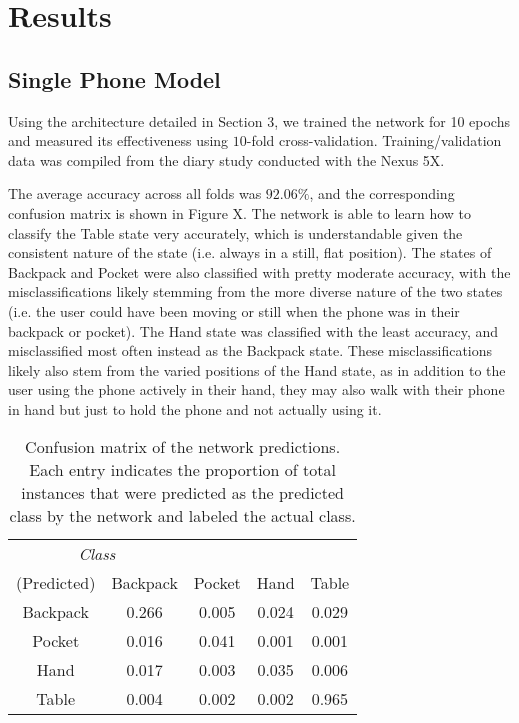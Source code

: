 \section{Results}
\subsection{Single Phone Model}
Using the architecture detailed in Section 3, we trained the network for 10 epochs
and measured its effectiveness using $10$-fold cross-validation.
Training/validation data was compiled from the diary study conducted with the Nexus 5X.

The average accuracy across all folds was $92.06\%$, and the corresponding
confusion matrix is shown in Figure X. The network is able to learn how to 
classify the Table state very accurately, which is understandable given 
the consistent nature of the state (i.e. always in a still, flat position). The states
of Backpack and Pocket were also classified with pretty moderate accuracy,
with the misclassifications likely stemming from the more diverse nature of 
the two states (i.e. the user could have been moving or still when the phone was
in their backpack or pocket). The Hand state was classified with the least accuracy,
and misclassified most often instead as the Backpack state. These misclassifications
likely also stem from the varied positions of the Hand state, as in addition to the user
using the phone actively in their hand, they may also walk with their phone in hand
but just to hold the phone and not actually using it.


\begin{table}[h]
\caption{Confusion matrix of the network predictions. Each entry indicates the proportion of
total instances that were predicted as the predicted class by the network and labeled the actual class.}\label{fig:confusion} \centering
\begin{tabular}{| c || c | c | c | c }  
\toprule
\multicolumn{2}{c}{\textit{Class}}\multicolumn{3}{c}{(Actual)} \\ \cmidrule{1-5}
(Predicted)		&	Backpack    & 	Pocket 	& 	Hand	&	Table \\
\midrule
Backpack			&	0.266 	&	0.005	&	0.024 	&	0.029 \\
Pocket			&	0.016 	&	0.041 	&	0.001 	&	0.001 \\
Hand			&	0.017 	&	0.003 	&	0.035 	&	0.006 \\
Table			&	0.004 	&	0.002 	&	0.002 	&	0.965\\
\bottomrule
\end{tabular}
\end{table}


